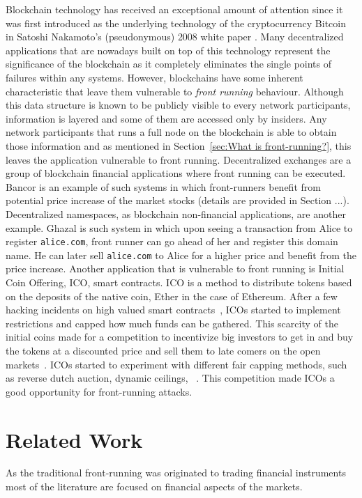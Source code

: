 Blockchain technology has received an exceptional amount of attention since it was first introduced as the underlying technology of the cryptocurrency Bitcoin in Satoshi Nakamoto's (pseudonymous) 2008 white paper \cite{nakamoto2008bitcoin}. Many decentralized applications that are nowadays built on top of this technology represent the significance of the blockchain as it completely eliminates the single points of failures within any systems. However, blockchains have some inherent characteristic that leave them vulnerable to \emph{front running} behaviour. Although this data structure is known to be publicly visible to every network participants, information is layered  and some of them are accessed only by insiders. Any network participants that runs a full node on the blockchain is able to obtain those information and as mentioned in Section~\ref{sec:What is front-running?}, this leaves the application vulnerable to front running. Decentralized exchanges are a group of blockchain financial applications where front running can be executed. Bancor \cite{hertzog2017bancor} is an example of such systems in which front-runners benefit from potential price increase of the market stocks (details are provided in Section ...). Decentralized namespaces, as blockchain non-financial applications, are another example. Ghazal \cite{moosavighazal} is such system in which upon seeing a transaction from Alice to register \texttt{alice.com}, front runner can go ahead of her and register this domain name. He can later sell \texttt{alice.com} to Alice for a higher price and benefit from the price increase.
Another application that is vulnerable to front running is Initial Coin Offering, ICO, smart contracts. ICO is a method to distribute tokens based on the deposits of the native coin, Ether in the case of Ethereum. After a few hacking incidents on high valued smart contracts~\cite{siegel2016daohack}, ICOs started to implement restrictions and capped how much funds can be gathered. This scarcity of the initial coins made for a competition to incentivize big investors to get in and buy the tokens at a discounted price and sell them to late comers on the open markets~\cite{zetzsche2018ico, li2018initial}. ICOs started to experiment with different fair capping methods, such as reverse dutch auction, dynamic ceilings, \eg ~\cite{kaal2017initial}.  This competition made ICOs a good opportunity for front-running attacks. 



\section{Related Work}
As the traditional front-running was originated to trading financial instruments most of the literature are focused on financial aspects of the markets. %


